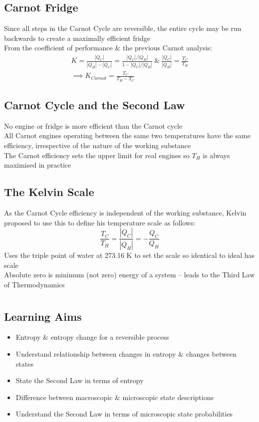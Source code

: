 \documentclass[a4paper, 11pt, fleqn, normalem]{report}
\begin{document}
\section{Carnot Fridge}
Since all steps in the Carnot Cycle are reversible, the entire cycle may be run backwards to create a maximally efficient fridge \\
From the coefficient of performance \& the previous Carnot analysis:
\begin{gather*}
	K = \frac{|Q_{C}|}{|Q_{H}| - |Q_{C}|} = \frac{|Q_{C}|/|Q_{H}|}{1 - |Q_{C}|/|Q_{H}|} ~\&~ \frac{|Q_{C}|}{|Q_{H}|} = \frac{T_{C}}{T_{H}} \\
	\implies K_{Carnot} = \frac{T_{C}}{T_{H} - T_{C}}
\end{gather*}

\section{Carnot Cycle and the Second Law}
No engine or fridge is more efficient than the Carnot cycle \\
All Carnot engines operating between the same two temperatures have the same efficiency, irrespective of the nature of the working substance \\
The Carnot efficiency sets the upper limit for real engines so $T_{H}$ is always maximised in practice

\section{The Kelvin Scale}
As the Carnot Cycle efficiency is independent of the working substance, Kelvin proposed to use this to define his temperature scale as follows:
\begin{equation*}
	\frac{T_{C}}{T_{H}} = \frac{|Q_{C}|}{|Q_{H}|} = -\frac{Q_{C}}{Q_{H}}
\end{equation*}
Uses the triple point of water at 273.16 K to set the scale so identical to ideal has scale \\
Absolute zero is minimum (not zero) energy of a system -- leads to the Third Law of Thermodynamics

\chapter{}
\thispagestyle{fancy}
\section{Learning Aims}
\begin{itemize}
	\item Entropy \& entropy change for a reversible process
	\item Understand relationship between changes in entropy \& changes between states
	\item State the Second Law in terms of entropy
	\item Difference between macroscopic \& microscopic state descriptions
	\item Understand the Second Law in terms of microscopic state probabilities
\end{itemize}
\end{document}
